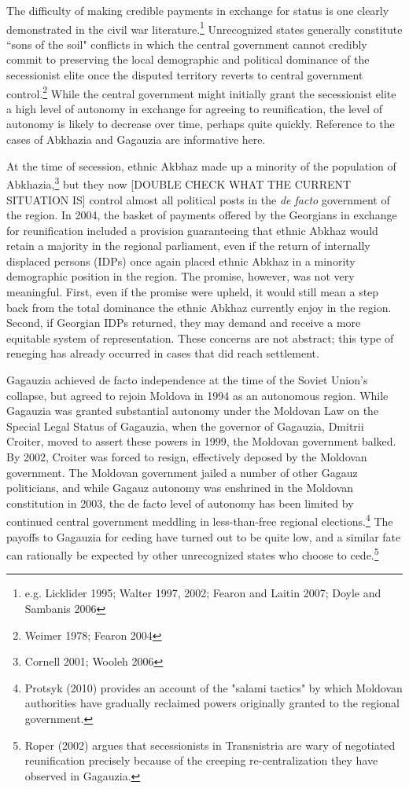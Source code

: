 \documentclass[12pt,letterpaper, notitlepage]{article}
\begin{document}
The difficulty of making credible payments in exchange for status is one clearly demonstrated in the civil war literature.\footnote{e.g. Licklider 1995; Walter 1997, 2002; Fearon and Laitin 2007; Doyle and Sambanis 2006} Unrecognized states generally constitute ``sons of the soil" conflicts in which the central government cannot credibly commit to preserving the local demographic and political dominance of the secessionist elite once the disputed territory reverts to central government control.\footnote{Weimer 1978; Fearon 2004}  While the central government might initially grant the secessionist elite a high level of autonomy in exchange for agreeing to reunification, the level of autonomy is likely to decrease over time, perhaps quite quickly.  Reference to the cases of Abkhazia and Gagauzia are informative here.

At the time of secession, ethnic Akbhaz made up a minority of the population of Abkhazia,\footnote{Cornell 2001; Wooleh 2006} but they now [DOUBLE CHECK WHAT THE CURRENT SITUATION IS] control almost all political posts in the \textit{de facto} government of the region. In 2004, the basket of payments offered by the Georgians in exchange for reunification included a provision guaranteeing that ethnic Abkhaz would retain a majority in the regional parliament, even if the return of internally displaced persons (IDPs) once again placed ethnic Abkhaz in a minority demographic position in the region. The promise, however, was not very meaningful.  First, even if the promise were upheld, it would still mean a step back from the total dominance the ethnic Abkhaz currently enjoy in the region.  Second, if Georgian IDPs returned, they may demand and receive a more equitable system of representation.  These concerns are not abstract; this type of reneging has already occurred in cases that did reach settlement.

Gagauzia achieved de facto independence at the time of the Soviet Union's collapse, but agreed to rejoin Moldova in 1994 as an autonomous region.  While Gagauzia was granted substantial autonomy under the Moldovan Law on the Special Legal Status of Gagauzia, when the governor of Gagauzia, Dmitrii Croiter, moved to assert these powers in 1999, the Moldovan government balked.  By 2002, Croiter was forced to resign, effectively deposed by the Moldovan government.  The Moldovan government jailed a number of other Gagauz politicians, and while Gagauz autonomy was enshrined in the Moldovan constitution in 2003, the de facto level of autonomy has been limited by continued central government meddling in less-than-free regional elections.\footnote{Protsyk (2010) provides an account of the "salami tactics" by which Moldovan authorities have gradually reclaimed powers originally granted to the regional government.} The payoffs to Gagauzia for ceding have turned out to be quite low, and a similar fate can rationally be expected by other unrecognized states who choose to cede.\footnote{Roper (2002) argues that secessionists in Transnistria are wary of negotiated reunification precisely because of the creeping re-centralization they have observed in Gagauzia.}
\end{document}
